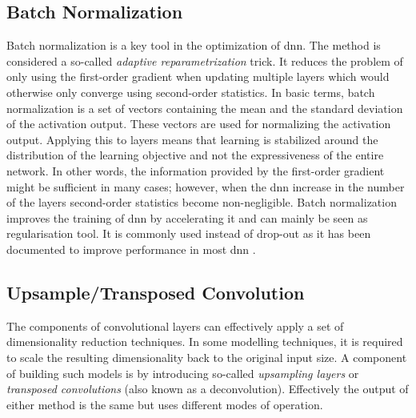 \subsection{Batch Normalization}\label{subsec:batch_normalization}
Batch normalization is a key tool in the optimization of \gls{dnn}. The method is considered a so-called \emph{adaptive reparametrization} trick. It reduces the problem of only using the first-order gradient when updating multiple layers which would otherwise only converge using second-order statistics. In basic terms, batch normalization is a set of vectors containing the mean and the standard deviation of the activation output. These vectors are used for normalizing the activation output. Applying this to layers means that learning is stabilized around the distribution of the learning objective and not the expressiveness of the entire network. In other words, the information provided by the first-order gradient might be sufficient in many cases; however, when the \gls{dnn} increase in the number of the layers second-order statistics become non-negligible. Batch normalization improves the training of \gls{dnn} by accelerating it and can mainly be seen as regularisation tool. It is commonly used instead of drop-out as it has been documented to improve performance in most \gls{dnn} \cite{Goodfellow-et-al-2016}.



\subsection{Upsample/Transposed Convolution}
The components of convolutional layers can effectively apply a set of dimensionality reduction techniques. In some modelling techniques, it is required to scale the resulting dimensionality back to the original input size. A component of building such models is by introducing so-called \emph{upsampling layers} or \emph{transposed convolutions} (also known as a deconvolution). Effectively the output of either method is the same but uses different modes of operation. 



